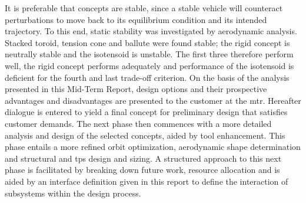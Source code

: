 \newline
\newline
It is preferable that concepts are stable, since a stable vehicle will counteract perturbations to move back to its equilibrium condition and its intended trajectory. To this end, static stability was investigated by aerodynamic analysis. Stacked toroid, tension cone and ballute were found stable; the rigid concept is neutrally stable and the isotensoid is unstable. The first three therefore perform well, the rigid concept performs adequately and performance of the isotensoid is deficient for the fourth and last trade-off criterion.
\newline
\newline
On the basis of the analysis presented in this Mid-Term Report, design options and their prospective advantages and disadvantages are presented to the customer at the \gls{mtr}. Hereafter dialogue is entered to yield a final concept for preliminary design that satisfies customer demands. The next phase then commences with a more detailed analysis and design of the selected concepts, aided by tool enhancement. This phase entails a more refined orbit optimization, aerodynamic shape determination and structural and \gls{tps} design and sizing. A structured approach to this next phase is facilitated by breaking down future work, resource allocation and is aided by an interface definition given in this report to define the interaction of subsystems within the design process.